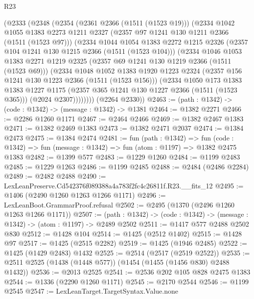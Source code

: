 \begin{lexlean}{R23}
\begin{coremodule}
    (@2333
      (@2348
        (@2354
          (@2361 @2366 (@1511 (@1523 @19)))
          (@2334
            @1042
            @1055
            @1383
            @2273
            @1211
            @2327
            (@2357 @97 @1241 @130 @1211 @2366 (@1511 (@1523 @97)))
            (@2334
              @1044
              @1054
              @1383
              @2272
              @1215
              @2326
              (@2357 @104 @1241 @130 @1215 @2366 (@1511 (@1523 @104)))
              (@2334
                @1046
                @1053
                @1383
                @2271
                @1219
                @2325
                (@2357 @69 @1241 @130 @1219 @2366 (@1511 (@1523 @69)))
                (@2334
                  @1048
                  @1052
                  @1383
                  @1920
                  @1223
                  @2324
                  (@2357 @156 @1241 @130 @1223 @2366 (@1511 (@1523 @156)))
                  (@2334
                    @1050
                    @173
                    @1383
                    @1383
                    @1227
                    @1175
                    (@2357 @365 @1241 @130 @1227 @2366 (@1511 (@1523 @365)))
                    (@2024 @2307))))))))
      (@2264 @2330))
@2463 := (path : @1342) -> (code : @1342) -> (message : @1342) -> @1381
@2464 := @1382 @2271
@2466 := @2286 @1260 @1171
@2467 := @2464 @2466
@2469 := @1382 @2467 @1383
@2471 := @1382 @2469 @1383
@2473 := @1382 @2471 @2037
@2474 := @1384 @2473
@2475 := @1384 @2474
@2481 := fun (path : @1342) =>
  fun (code : @1342) => fun (message : @1342) => fun (atom : @1197) => @1382 @2475 @1383
@2482 := @1399 @577
@2483 := @1229 @1260
@2484 := @1199 @2483
@2485 := @1229 @1263
@2486 := @1199 @2485
@2488 := @2484 (@2486 @2284)
@2489 := @2482 @2488
@2490 := LexLeanPreserve.Cd542376f089388a4a783f2fc4c26811f.R23.__fits_12
@2495 := @1406 (@2490 @1260 @1263 @1266 @1171)
@2496 := LexLeanBoot.GrammarProof.refusal
@2502 := @2495 (@1370 (@2496 @1260 @1263 @1266 @1171))
@2507 := (path : @1342) -> (code : @1342) -> (message : @1342) -> (atom : @1197) -> @2489 @2502
@2511 := @1417 @577 @2488 @2502 @830
@2512 := @1428 @104
@2514 := @1425 (@2512 @1402)
@2515 := @1428 @97
@2517 := @1425 (@2515 @2282)
@2519 := @1425 (@1946 @2485)
@2522 := @1425 (@1429 @2483) @1432
@2525 := @2514 (@2517 (@2519 @2522))
@2535 := @2511 @2525 (@1438 (@1448 @577)) (@1454 (@1455 (@1456 @830) @2488 @1432))
@2536 := @2013 @2525
@2541 := @2536 @202 @105 @828 @2475 @1383
@2544 := @1336 (@2290 @1260 @1171)
@2545 := @2170 @2544
@2546 := @1199 @2545
@2547 := LexLeanTarget.TargetSyntax.Value.none

\end{coremodule}
\end{lexlean}
